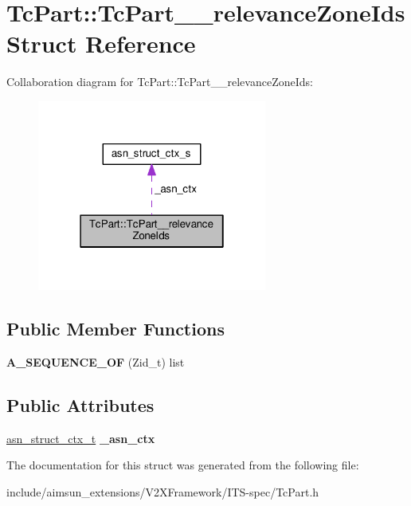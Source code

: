 \hypertarget{structTcPart_1_1TcPart____relevanceZoneIds}{}\section{Tc\+Part\+:\+:Tc\+Part\+\_\+\+\_\+relevance\+Zone\+Ids Struct Reference}
\label{structTcPart_1_1TcPart____relevanceZoneIds}


Collaboration diagram for Tc\+Part\+:\+:Tc\+Part\+\_\+\+\_\+relevance\+Zone\+Ids\+:\nopagebreak
\begin{figure}[H]
\begin{center}
\leavevmode
\includegraphics[width=214pt]{structTcPart_1_1TcPart____relevanceZoneIds__coll__graph}
\end{center}
\end{figure}
\subsection*{Public Member Functions}
\begin{DoxyCompactItemize}
\item 
{\bfseries A\+\_\+\+S\+E\+Q\+U\+E\+N\+C\+E\+\_\+\+OF} (Zid\+\_\+t) list\hypertarget{structTcPart_1_1TcPart____relevanceZoneIds_aa8ff8227be528f726a2651a73110582d}{}\label{structTcPart_1_1TcPart____relevanceZoneIds_aa8ff8227be528f726a2651a73110582d}

\end{DoxyCompactItemize}
\subsection*{Public Attributes}
\begin{DoxyCompactItemize}
\item 
\hyperlink{structasn__struct__ctx__s}{asn\+\_\+struct\+\_\+ctx\+\_\+t} {\bfseries \+\_\+asn\+\_\+ctx}\hypertarget{structTcPart_1_1TcPart____relevanceZoneIds_a5a9903acadc4cdc744748afb90f2893f}{}\label{structTcPart_1_1TcPart____relevanceZoneIds_a5a9903acadc4cdc744748afb90f2893f}

\end{DoxyCompactItemize}


The documentation for this struct was generated from the following file\+:\begin{DoxyCompactItemize}
\item 
include/aimsun\+\_\+extensions/\+V2\+X\+Framework/\+I\+T\+S-\/spec/Tc\+Part.\+h\end{DoxyCompactItemize}
